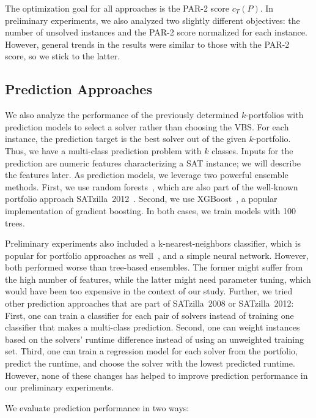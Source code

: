 \documentclass[a4paper,USenglish,pdfa]{lipics-v2021} %
\begin{document}
The optimization goal for all approaches is the PAR-2 score $c_T(P)$.
In preliminary experiments, we also analyzed two slightly different objectives:
the number of unsolved instances and the PAR-2 score normalized for each instance.
However, general trends in the results were similar to those with the PAR-2 score, so we stick to the latter.

\subsection{Prediction Approaches}

We also analyze the performance of the previously determined $k$-portfolios with prediction models to select a solver rather than choosing the VBS. 
For each instance, the prediction target is the best solver out of the given $k$-portfolio.
Thus, we have a multi-class prediction problem with $k$ classes.
Inputs for the prediction are numeric features characterizing a SAT instance; we will describe the features later. 
As prediction models, we leverage two powerful ensemble methods.
First, we use random forests~\cite{breiman2001random}, which are also part of the well-known portfolio approach SATzilla~2012~\cite{xu2012satzilla2012}.
Second, we use XGBoost~\cite{xgboost}, a popular implementation of gradient boosting.
In both cases, we train models with 100 trees.

Preliminary experiments also included a k-nearest-neighbors classifier, which is popular for portfolio approaches as well~\cite{Collautti:2013:SNNAP,malitsky2011non,nikolic2013simple,samulowitz2013snappy}, and a simple neural network.
However, both performed worse than tree-based ensembles.
The former might suffer from the high number of features, while the latter might need parameter tuning, which would have been too expensive in the context of our study.
Further, we tried other prediction approaches that are part of SATzilla~2008 or SATzilla~2012:
First, one can train a classifier for each pair of solvers instead of training one classifier that makes a multi-class prediction.
Second, one can weight instances based on the solvers' runtime difference instead of using an unweighted training set.
Third, one can train a regression model for each solver from the portfolio, predict the runtime, and choose the solver with the lowest predicted runtime.
However, none of these changes has helped to improve prediction performance in our preliminary experiments.

We evaluate prediction performance in two ways:
\end{document}
